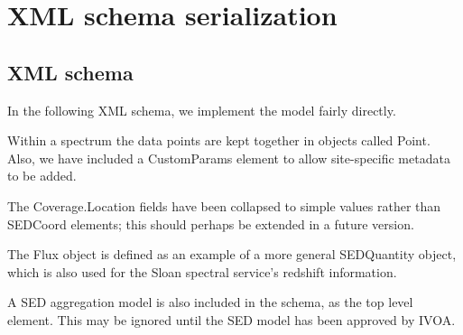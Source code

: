 \section{XML schema serialization}

\subsection{XML schema}

In the following XML schema, we implement the model fairly directly.

Within a spectrum the data points are kept together in objects called Point.
Also, we have included
a CustomParams element to allow site-specific metadata to be added.

The Coverage.Location fields have been collapsed to simple values rather than SEDCoord elements; this should
perhaps be extended in a future version.

The Flux object is defined as an example of a more general SEDQuantity object, which is
also used for the Sloan spectral service's redshift information.

A SED aggregation model is also included in the schema, as the top level
element. This may be ignored until the SED model has been approved by IVOA.



